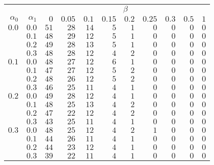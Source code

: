 \begin{tabular}{rr|rrrrrrrrr}
\hline\hline
 && \multicolumn{9}{c}{$\beta$}\\
 $\alpha_0$ & $\alpha_1$ & $0$ & $0.05$ & $0.1$ & $0.15$ & $0.2$ & $0.25$ & $0.3$ & $0.5$ & $1$ \\ 
 \hline
$0.0$ & $0.0$ & $51$ & $28$ & $14$ & $5$ & $1$ & $0$ & $0$ & $0$ & $0$\\ 
 & $0.1$ & $48$ & $29$ & $12$ & $5$ & $1$ & $0$ & $0$ & $0$ & $0$\\ 
 & $0.2$ & $49$ & $28$ & $13$ & $5$ & $1$ & $0$ & $0$ & $0$ & $0$\\ 
 & $0.3$ & $48$ & $28$ & $12$ & $4$ & $2$ & $0$ & $0$ & $0$ & $0$\\ 
\hline 
 $0.1$ & $0.0$ & $48$ & $27$ & $12$ & $6$ & $1$ & $0$ & $0$ & $0$ & $0$\\ 
 & $0.1$ & $47$ & $27$ & $12$ & $5$ & $2$ & $0$ & $0$ & $0$ & $0$\\ 
 & $0.2$ & $48$ & $26$ & $12$ & $5$ & $2$ & $0$ & $0$ & $0$ & $0$\\ 
 & $0.3$ & $46$ & $25$ & $11$ & $4$ & $1$ & $0$ & $0$ & $0$ & $0$\\ 
\hline 
 $0.2$ & $0.0$ & $49$ & $28$ & $12$ & $4$ & $1$ & $0$ & $0$ & $0$ & $0$\\ 
 & $0.1$ & $48$ & $25$ & $13$ & $4$ & $2$ & $0$ & $0$ & $0$ & $0$\\ 
 & $0.2$ & $47$ & $22$ & $12$ & $4$ & $2$ & $0$ & $0$ & $0$ & $0$\\ 
 & $0.3$ & $43$ & $25$ & $11$ & $4$ & $1$ & $0$ & $0$ & $0$ & $0$\\ 
\hline 
 $0.3$ & $0.0$ & $48$ & $25$ & $12$ & $4$ & $2$ & $1$ & $0$ & $0$ & $0$\\ 
 & $0.1$ & $44$ & $26$ & $11$ & $4$ & $1$ & $0$ & $0$ & $0$ & $0$\\ 
 & $0.2$ & $44$ & $23$ & $12$ & $4$ & $1$ & $0$ & $0$ & $0$ & $0$\\ 
 & $0.3$ & $39$ & $22$ & $11$ & $4$ & $1$ & $0$ & $0$ & $0$ & $0$\\ 
 \hline 
 \end{tabular}